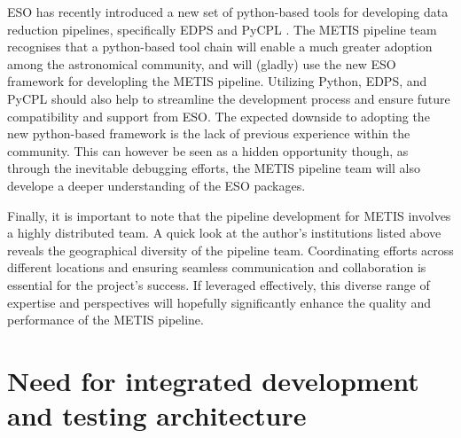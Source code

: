 \documentclass[a4paper]{spie}  %
\begin{document}
ESO has recently introduced a new set of python-based tools for developing data reduction pipelines, specifically EDPS \cite{edps} and PyCPL \cite{pycpl}. 
The METIS pipeline team recognises that a python-based tool chain will enable a much greater adoption among the astronomical community, and will (gladly) use the new ESO framework for developling the METIS pipeline. 
Utilizing Python, EDPS, and PyCPL should also help to streamline the development process and ensure future compatibility and support from ESO.
The expected downside to adopting the new python-based framework is the lack of previous experience within the community.
This can however be seen as a hidden opportunity though, as through the inevitable debugging efforts, the METIS pipeline team will also develope a deeper understanding of the ESO packages.

Finally, it is important to note that the pipeline development for METIS involves a highly distributed team. 
A quick look at the author's institutions listed above reveals the geographical diversity of the pipeline team.
Coordinating efforts across different locations and ensuring seamless communication and collaboration is essential for the project's success. 
If leveraged effectively, this diverse range of expertise and perspectives will hopefully significantly enhance the quality and performance of the METIS pipeline.




\section{Need for integrated development and testing architecture}
\label{sec:dev}

\end{document}
